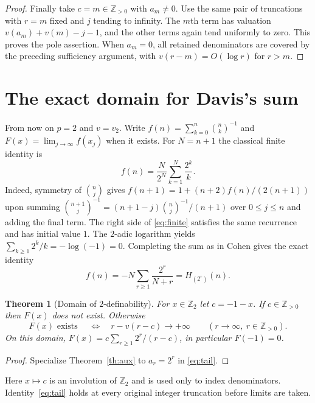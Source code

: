 \documentclass[11pt]{article}
\newtheorem{theorem}{Theorem}[section]
\begin{document}
\begin{proof}
Finally take $c=m\in\mathbb Z_{>0}$ with $a_m\ne0$.
Use the same pair of truncations with $r=m$ fixed and $j$ tending to infinity.
The $m$th term has valuation $v(a_m)+v(m)-j-1$, and the other terms
again tend uniformly to zero. This proves the pole assertion. When $a_m=0$, all retained denominators are covered by the preceding sufficiency argument, with $v(r-m)=O(\log r)$ for $r>m$.
\end{proof}

\section{The exact domain for Davis's sum}\label{sec:domain}
From now on $p=2$ and $v=v_2$. Write $f(n)=\sum_{k=0}^n\binom nk^{-1}$ and $F(x)=\lim_{j\to\infty}f(x_j)$ when it exists.
For $N=n+1$ the classical finite identity \cite{Rockett} is
\begin{equation}\label{eq:finite}
             f(n)=\frac{N}{2^N}\sum_{k=1}^N\frac{2^k}{k}.
\end{equation}
Indeed, symmetry of $\binom nj$ gives $f(n+1)=1+(n+2)f(n)/(2(n+1))$ upon summing $\binom{n+1}{j}^{-1}=(n+1-j)\binom nj^{-1}/(n+1)$ over $0\le j\le n$ and adding the final term. The right side of \eqref{eq:finite} satisfies the same recurrence and has initial value $1$.
The $2$-adic logarithm yields $\sum_{k\ge1}2^k/k=-\log(-1)=0$.
Completing the sum as in Cohen \cite[Lemmas 2 and 4]{Cohen} gives the exact identity
\begin{equation}\label{eq:tail}
          f(n)=-N\sum_{r\ge1}\frac{2^r}{N+r}=H_{(2^r)}(n).
\end{equation}

\begin{theorem}[Domain of $2$-definability]\label{th:domain}
For $x\in\mathbb Z_2$ let $c=-1-x$. If $c\in\mathbb Z_{>0}$ then $F(x)$ does not exist. Otherwise
\begin{equation}\label{eq:iff}
 F(x)\text{ exists }\quad\Longleftrightarrow\quad
          r-v(r-c)\longrightarrow+\infty
            \qquad(r\longrightarrow\infty,\ r\in\mathbb Z_{>0}).
\end{equation}
On this domain, $F(x)=c\sum_{r\ge1}2^r/(r-c)$, in particular $F(-1)=0$.
\end{theorem}
\begin{proof}
Specialize Theorem~\ref{th:aux} to $a_r=2^r$ in \eqref{eq:tail}.
\end{proof}
Here $x\mapsto c$ is an involution of $\mathbb Z_2$ and is used only to index denominators. Identity~\eqref{eq:tail} holds at every original integer truncation before limits are taken.
\end{document}

